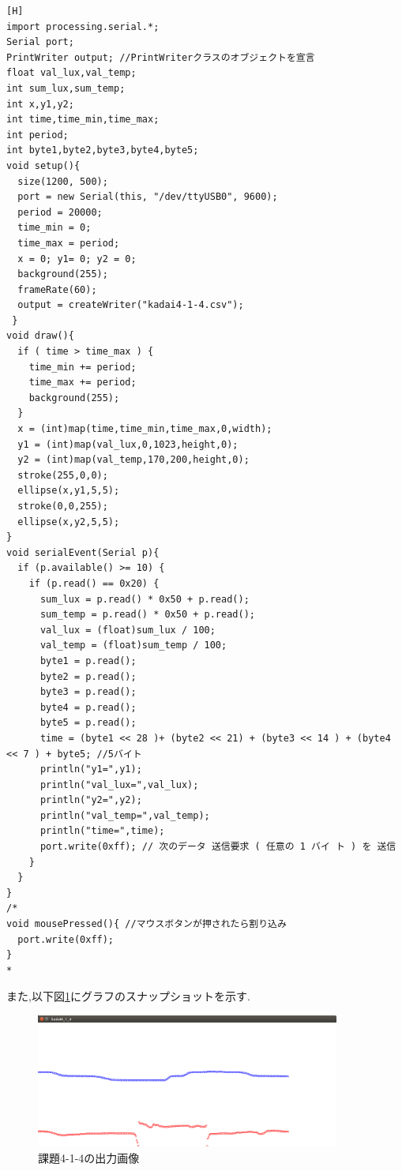 \documentclass{jarticle}
\begin{document}
\begin{lstlisting}[caption = 課題4.1.4(Processing),label=code:kadai4-1-4-p][H]
import processing.serial.*;
Serial port;
PrintWriter output; //PrintWriterクラスのオブジェクトを宣言
float val_lux,val_temp;
int sum_lux,sum_temp;
int x,y1,y2;
int time,time_min,time_max;
int period;
int byte1,byte2,byte3,byte4,byte5;
void setup(){
  size(1200, 500);
  port = new Serial(this, "/dev/ttyUSB0", 9600);
  period = 20000;
  time_min = 0;
  time_max = period;
  x = 0; y1= 0; y2 = 0;
  background(255);
  frameRate(60);
  output = createWriter("kadai4-1-4.csv");
 }
void draw(){
  if ( time > time_max ) {
    time_min += period;
    time_max += period;
    background(255);
  }
  x = (int)map(time,time_min,time_max,0,width);
  y1 = (int)map(val_lux,0,1023,height,0);
  y2 = (int)map(val_temp,170,200,height,0);
  stroke(255,0,0);
  ellipse(x,y1,5,5);
  stroke(0,0,255);
  ellipse(x,y2,5,5);
}
void serialEvent(Serial p){
  if (p.available() >= 10) {
    if (p.read() == 0x20) {
      sum_lux = p.read() * 0x50 + p.read();
      sum_temp = p.read() * 0x50 + p.read();
      val_lux = (float)sum_lux / 100;
      val_temp = (float)sum_temp / 100;
      byte1 = p.read();
      byte2 = p.read();
      byte3 = p.read();
      byte4 = p.read();
      byte5 = p.read();
      time = (byte1 << 28 )+ (byte2 << 21) + (byte3 << 14 ) + (byte4 << 7 ) + byte5; //5バイト
      println("y1=",y1);
      println("val_lux=",val_lux);
      println("y2=",y2);
      println("val_temp=",val_temp);
      println("time=",time);
      port.write(0xff); // 次のデータ 送信要求 ( 任意の 1 バイ ト ) を 送信
    }
  }
}
/*
void mousePressed(){ //マウスボタンが押されたら割り込み
  port.write(0xff);
}
*
\end{lstlisting}

また,以下図\ref{fig:kadai4-1-4}にグラフのスナップショットを示す.

\begin{figure}[H]
\begin{center}
\includegraphics[width=10.0cm]{images/kadai4-1-4.png}
\caption{課題4-1-4の出力画像}
\label{fig:kadai4-1-4}
\end{center}
\end{figure}
\end{document}
